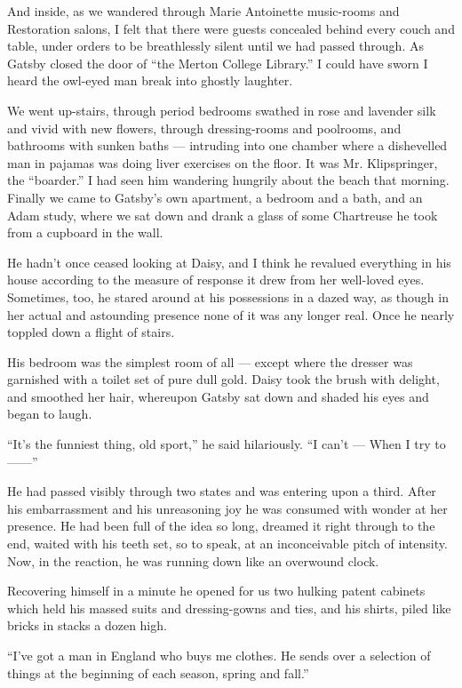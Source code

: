 \documentclass{znotebook}
\begin{document}
And inside, as we wandered through Marie Antoinette music-rooms and Restoration salons, I felt that there were guests concealed behind every couch and table, under orders to be breathlessly silent until we had passed through. As Gatsby closed the door of ``the Merton College Library.'' I could have sworn I heard the owl-eyed man break into ghostly laughter.

We went up-stairs, through period bedrooms swathed in rose and lavender silk and vivid with new flowers, through dressing-rooms and poolrooms, and bathrooms with sunken baths — intruding into one chamber where a dishevelled man in pajamas was doing liver exercises on the floor. It was Mr. Klipspringer, the ``boarder.'' I had seen him wandering hungrily about the beach that morning. Finally we came to Gatsby's own apartment, a bedroom and a bath, and an Adam study, where we sat down and drank a glass of some Chartreuse he took from a cupboard in the wall.

He hadn't once ceased looking at Daisy, and I think he revalued everything in his house according to the measure of response it drew from her well-loved eyes. Sometimes, too, he stared around at his possessions in a dazed way, as though in her actual and astounding presence none of it was any longer real. Once he nearly toppled down a flight of stairs.

His bedroom was the simplest room of all — except where the dresser was garnished with a toilet set of pure dull gold. Daisy took the brush with delight, and smoothed her hair, whereupon Gatsby sat down and shaded his eyes and began to laugh.

``It's the funniest thing, old sport,'' he said hilariously. ``I can't — When I try to ——''

He had passed visibly through two states and was entering upon a third. After his embarrassment and his unreasoning joy he was consumed with wonder at her presence. He had been full of the idea so long, dreamed it right through to the end, waited with his teeth set, so to speak, at an inconceivable pitch of intensity. Now, in the reaction, he was running down like an overwound clock.

Recovering himself in a minute he opened for us two hulking patent cabinets which held his massed suits and dressing-gowns and ties, and his shirts, piled like bricks in stacks a dozen high.

``I've got a man in England who buys me clothes. He sends over a selection of things at the beginning of each season, spring and fall.''
\end{document}

